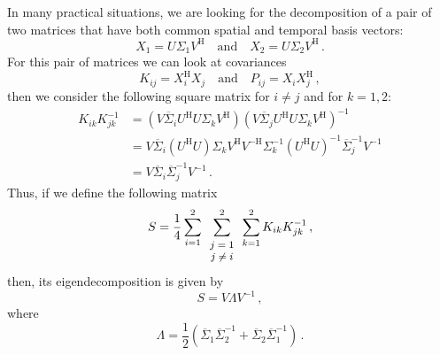\documentclass[10pt]{article}
\begin{document}
In many practical situations, we are looking for the decomposition of a pair of two matrices that have both common spatial and temporal basis vectors:
\begin{equation}
	X_1 = U \Sigma_1 V^\mathrm{H} \quad \mathrm{and} \quad X_2 = U \Sigma_2 V^\mathrm{H}\,.
\end{equation}
For this pair of matrices we can look at covariances
\begin{equation}
	K_{ij} = X_i^\mathrm{H}X_j \quad \mathrm{and} \quad P_{ij} = X_i X_j^\mathrm{H}\,,
\end{equation}
then we consider the following square matrix for $i\ne j$ and for $k = 1,2$:
\begin{equation}
\begin{aligned}
	K_{ik}K_{jk}^{-1} &= \left( V \overline{\Sigma}_i U^\mathrm{H} U \Sigma_k V^\mathrm{H}\right)    \left(V \overline{\Sigma}_j U^\mathrm{H} U \Sigma_k V^\mathrm{H} \right)^{-1}\\
	&= V \overline{\Sigma}_i \left( U^\mathrm{H}  U \right) \Sigma_k V^\mathrm{H} V^{-\mathrm{H}} \Sigma_k^{-1} \left(U^\mathrm{H} U \right)^{-1} \overline{\Sigma}_j^{-1} V^{-1}\\ &= V \overline{\Sigma}_i \overline{\Sigma}_j^{-1} V^{-1}\,.
\end{aligned}
\end{equation}
Thus, if we define the following matrix
\begin{equation}
	S = \frac{1}{4}\sum_{i=1}^2 \sum_{\footnotesize \begin{array}{c} j=1\\j\ne i
	\end{array}}^2\sum_{k=1}^2 K_{ik}K_{jk}^{-1}\,,
\end{equation}
then, its eigendecomposition is given by
\begin{equation}
	S = V \Lambda V^{-1}\,,
\end{equation}
where 
\begin{equation}
	\Lambda = \frac{1}{2}\left( \overline{\Sigma}_1 \overline{\Sigma}_2^{-1} + \overline{\Sigma}_2 \overline{\Sigma}_1^{-1} \right)\,.
\end{equation}
\end{document}
